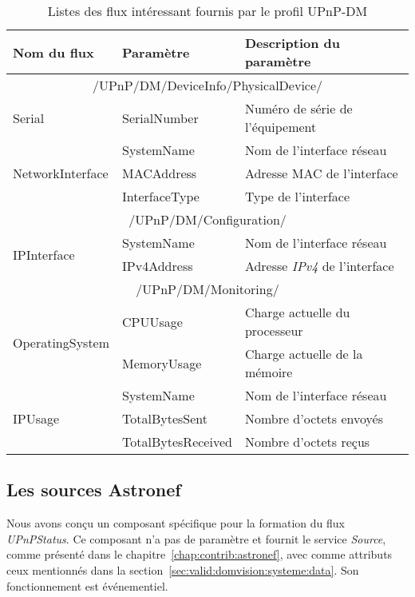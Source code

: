 \begin{table}[ht]
\centering
\begin{tabular}{|m{}|>{\ttfamily}m{}|m{}|} \bottomrule
\rowcolor{hypcolor} Nom du flux & \rm Paramètre & Description du paramètre\\ \hline
\multicolumn{3}{|c|}{/UPnP/DM/DeviceInfo/PhysicalDevice/} \\\hline
Serial & {SerialNumber} & Numéro de série de l'équipement\\\hline
\multirow{3}{*}{NetworkInterface} & {SystemName} & Nom de l'interface réseau\\\cline{2-3}
& {MACAddress} & Adresse MAC de l'interface\\\cline{2-3}
& InterfaceType & Type de l'interface \\\hline
\multicolumn{3}{|c|}{/UPnP/DM/Configuration/} \\\hline
\multirow{2}{*}{IPInterface} & SystemName & Nom de l'interface réseau \\\cline{2-3}
& IPv4Address & Adresse \textit{IPv4} de l'interface \\ \hline
\multicolumn{3}{|c|}{/UPnP/DM/Monitoring/} \\\hline
\multirow{2}{*}{OperatingSystem} & CPUUsage & Charge actuelle du processeur\\\cline{2-3}
& MemoryUsage & Charge actuelle de la mémoire\\ \hline
\multirow{3}{*}{IPUsage} & SystemName & Nom de l'interface réseau\\ \cline{2-3}
& TotalBytesSent & Nombre d'octets envoyés \\\cline{2-3}
& TotalBytesReceived & Nombre d'octets reçus \\ \toprule
\end{tabular}
\caption{Listes des flux intéressant fournis par le profil UPnP-DM}\label{tab:valid:domvision:upnpdm}
\end{table}

\subsection{Les sources Astronef}
Nous avons conçu un composant spécifique pour la formation du flux \textit{UPnPStatus}. Ce composant n'a pas de paramètre et fournit le service \textit{Source}, comme présenté dans le chapitre~\ref{chap:contrib:astronef}, avec comme attributs ceux mentionnés dans la section~\ref{sec:valid:domvision:systeme:data}. Son fonctionnement est événementiel.

